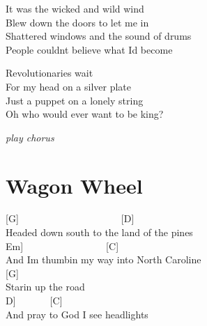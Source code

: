 \documentclass[
  letterpaper,
  a5paper]{memoir}
\begin{document}
It was the wicked and wild wind\\
Blew down the doors to let me in\\
Shattered windows and the sound of drums\\
People couldn\textquotesingle t believe what I\textquotesingle d become

Revolutionaries wait\\
For my head on a silver plate\\
Just a puppet on a lonely string\\
Oh who would ever want to be king?

\emph{play chorus}

\hypertarget{wagon-wheel}{%
\chapter{Wagon Wheel}\label{wagon-wheel}}

{[}G{]}~~~~~~~~~~~~~~~~~~~~~{[}D{]}\\
Headed down south to the land of the pines\\
\hspace*{0.333em}\hspace*{0.333em}\hspace*{0.333em}\hspace*{0.333em}\hspace*{0.333em}\hspace*{0.333em}\hspace*{0.333em}{[}Em{]}~~~~~~~~~~~~~~~~~{[}C{]}\\
And I\textquotesingle m thumbin\textquotesingle{} my way into North
Caroline\\
{[}G{]}\\
Starin\textquotesingle{} up the road\\
\hspace*{0.333em}\hspace*{0.333em}\hspace*{0.333em}\hspace*{0.333em}\hspace*{0.333em}\hspace*{0.333em}\hspace*{0.333em}\hspace*{0.333em}\hspace*{0.333em}\hspace*{0.333em}\hspace*{0.333em}{[}D{]}~~~~~~~{[}C{]}\\
And pray to God I see headlights
\end{document}
